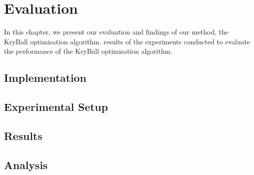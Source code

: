 \chapter{Evaluation}
\label{chap:evaluation}

In this chapter, we present our evaluation and findings of our method, the KryBall optimisation algorithm. 
results of the experiments conducted to evaluate the performance of the KryBall optimisation algorithm.


\section{Implementation}

\section{Experimental Setup}

\section{Results}

\section{Analysis}